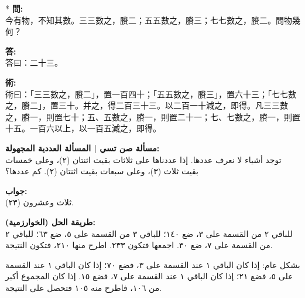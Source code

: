 \documentclass[11pt,a4paper]{article}
\newcommand{\ar}[1]{\arabicfont\beginR #1\endR}
\newcommand{\zh}[1]{{\CJKfamily{}#1}}
\begin{document}
\begin{tcolorbox}[colback=crtgold!8,colframe=crtgold,boxrule=1.5pt,
  left=12pt,right=12pt,top=10pt,bottom=10pt,arc=4mm,
  title={\textbf{\large Problem 26, Volume III (\zh{卷下第26問}) | \ar{المسألة 26 من المجلد الثالث} — The Chinese Remainder Theorem | \ar{مبرهنة الباقي الصينية}}},
  fonttitle=\bfseries\color{white},coltitle=white,
  colbacktitle=crtgold]

\vspace{0.3cm}

\begin{paracol}{2}
\switchcolumn[0]*\noindent
\textbf{\zh{問}:}\\
\zh{今有物，不知其數。三三數之，賸二；五五數之，賸三；七七數之，賸二。問物幾何？}

\vspace{0.3cm}

\textbf{\zh{答}:}\\
\zh{答曰：二十三。}

\vspace{0.3cm}

\textbf{\zh{術}:}\\
\zh{術曰：「三三數之，賸二」，置一百四十；「五五數之，賸三」，置六十三；「七七數之，賸二」，置三十。并之，得二百三十三。以二百一十減之，即得。凡三三數之，賸一，則置七十；五、五數之，賸一，則置二十一；七、七數之，賸一，則置十五。一百六以上，以一百五減之，即得。}

\switchcolumn
\noindent
\textbf{\ar{مسألة صن تسي | المسألة العددية المجهولة:}}\\
\ar{توجد أشياء لا نعرف عددها. إذا عددناها على ثلاثات بقيت اثنتان (٢)، وعلى خمسات بقيت ثلاث (٣)، وعلى سبعات بقيت اثنتان (٢). كم عددها؟}

\vspace{0.3cm}

\textbf{\ar{جواب:}}\\
\ar{ثلاث وعشرون (٢٣).}

\vspace{0.3cm}

\textbf{\ar{طريقة الحل (الخوارزمية):}}\\
\ar{للباقي ٢ من القسمة على ٣، ضع ١٤٠؛ للباقي ٣ من القسمة على ٥، ضع ٦٣؛ للباقي ٢ من القسمة على ٧، ضع ٣٠. اجمعها فتكون ٢٣٣. اطرح منها ٢١٠، فتكون النتيجة.}

\ar{بشكل عام: إذا كان الباقي ١ عند القسمة على ٣، فضع ٧٠؛ إذا كان الباقي ١ عند القسمة على ٥، فضع ٢١؛ إذا كان الباقي ١ عند القسمة على ٧، فضع ١٥. إذا كان المجموع أكبر من ١٠٦، فاطرح منه ١٠٥ فتحصل على النتيجة.}
\end{paracol}

\end{tcolorbox}
\end{document}
